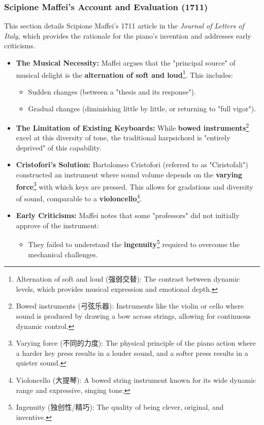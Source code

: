 \documentclass[math,code]{amznotes}
\theoremstyle{remark}
\begin{document}
\subsubsection{Scipione Maffei's Account and Evaluation (1711)}

This section details Scipione Maffei's 1711 article in the \textit{Journal of Letters of Italy}, which provides the rationale for the piano's invention and addresses early criticisms.

\begin{itemize}
    \item \textbf{The Musical Necessity:} Maffei argues that the "principal source" of musical delight is the \textbf{alternation of soft and loud}\footnote{Alternation of soft and loud (强弱交替): The contrast between dynamic levels, which provides musical expression and emotional depth.}. This includes:
    \begin{itemize}
        \item Sudden changes (between a "thesis and its response").
        \item Gradual changes (diminishing little by little, or returning to "full vigor").
    \end{itemize}
    \item \textbf{The Limitation of Existing Keyboards:} While \textbf{bowed instruments}\footnote{Bowed instruments (弓弦乐器): Instruments like the violin or cello where sound is produced by drawing a bow across strings, allowing for continuous dynamic control.} excel at this diversity of tone, the traditional harpsichord is "entirely deprived" of this capability.
    \item \textbf{Cristofori's Solution:} Bartolomeo Cristofori (referred to as "Ciristofali") constructed an instrument where sound volume depends on the \textbf{varying force}\footnote{Varying force (不同的力度): The physical principle of the piano action where a harder key press results in a louder sound, and a softer press results in a quieter sound.} with which keys are pressed. This allows for gradations and diversity of sound, comparable to a \textbf{violoncello}\footnote{Violoncello (大提琴): A bowed string instrument known for its wide dynamic range and expressive, singing tone.}.
    \item \textbf{Early Criticisms:} Maffei notes that some "professors" did not initially approve of the instrument:
    \begin{itemize}
        \item They failed to understand the \textbf{ingenuity}\footnote{Ingenuity (独创性/精巧): The quality of being clever, original, and inventive.} required to overcome the mechanical challenges.

\end{itemize}
\end{itemize}
\end{document}
